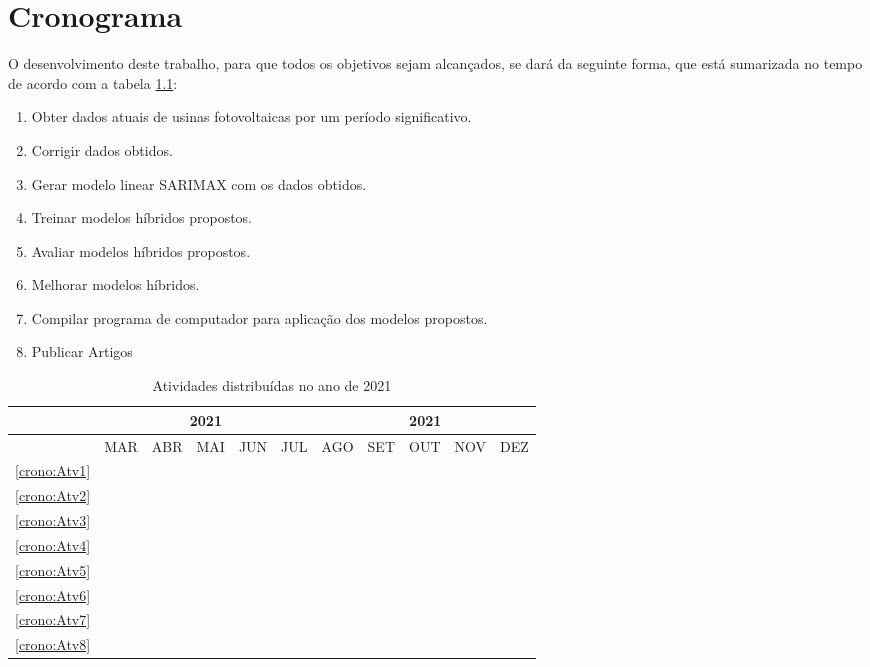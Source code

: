 \chapter{Cronograma}
\label{cap:cronograma}

O desenvolvimento deste trabalho, para que todos os objetivos sejam alcançados, se dará da seguinte forma, que está sumarizada no tempo de acordo com a tabela \ref{tab:cronograma}:

\begin{enumerate}
	\item \label{crono:Atv1} Obter dados atuais de usinas fotovoltaicas por um período significativo.
	\item \label{crono:Atv2} Corrigir dados obtidos.
	\item \label{crono:Atv3} Gerar modelo linear SARIMAX com os dados obtidos.
	\item \label{crono:Atv4} Treinar modelos híbridos propostos. 
	\item \label{crono:Atv5} Avaliar modelos híbridos propostos.
	\item \label{crono:Atv6} Melhorar modelos híbridos.
	\item \label{crono:Atv7} Compilar programa de computador para aplicação dos modelos propostos. \item \label{crono:Atv8} Publicar Artigos
\end{enumerate}

\begin{table}[h]
\caption{Atividades distribuídas no ano de 2021} 
\label{tab:cronograma}
\centering
	\begin{tabular}{|c|c|c|c|c|c|c|c|c|c|c|}
		\hline
		&\multicolumn{5}{c|}{2021}&\multicolumn{5}{c|}{2021}\\
		\hline
		&MAR&ABR&MAI&JUN&JUL&AGO&SET&OUT&NOV&DEZ\\
		\hline
		\ref{crono:Atv1}&\cellcolor{midgray}&\cellcolor{midgray}&&&&&&&&\\
		\hline
		\ref{crono:Atv2}&&&\cellcolor{midgray}&\cellcolor{midgray}&&&&&&\\
		\hline	
		\ref{crono:Atv3}&&&\cellcolor{midgray}&\cellcolor{midgray}&&&&&&\\
		\hline			
		\ref{crono:Atv4}&&&&\cellcolor{midgray}&\cellcolor{midgray}&&&&&\\
		\hline	
		\ref{crono:Atv5}&&&&\cellcolor{midgray}&\cellcolor{midgray}&&&&&\\
		\hline
		\ref{crono:Atv6}&&&&&\cellcolor{midgray}&\cellcolor{midgray}&&&&\\
		\hline	
		\ref{crono:Atv7}&&&&&&&\cellcolor{midgray}&\cellcolor{midgray}&&\\
		\hline
		\ref{crono:Atv8}&&&&&&&&&\cellcolor{midgray}&\cellcolor{midgray}\\
		\hline
	\end{tabular}
\end{table}